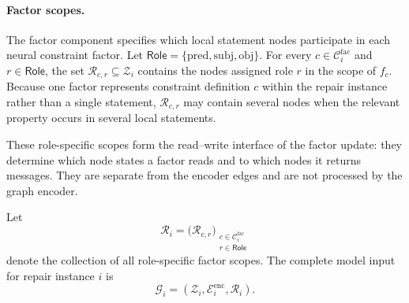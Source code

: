 \documentclass[a4paper,UKenglish,cleveref,autoref,thm-restate]{tgdk-v2021}
\begin{document}
\paragraph*{Factor scopes.}
The factor component specifies which local statement nodes participate in each neural constraint factor. Let \(\mathsf{Role}=\{\mathrm{pred},\mathrm{subj},\mathrm{obj}\}\). For every \(c\in\mathcal{C}_i^{\mathrm{fac}}\) and \(r\in\mathsf{Role}\), the set \(\mathcal{R}_{c,r}\subseteq\mathcal{Z}_i\) contains the nodes assigned role \(r\) in the scope of \(f_c\). Because one factor represents constraint definition \(c\) within the repair instance rather than a single statement, \(\mathcal{R}_{c,r}\) may contain several nodes when the relevant property occurs in several local statements.

These role-specific scopes form the read--write interface of the factor update: they determine which node states a factor reads and to which nodes it returns messages. They are separate from the encoder edges and are not processed by the graph encoder.

Let
\[
\mathcal{R}_i=\bigl(\mathcal{R}_{c,r}\bigr)_{\substack{c\in\mathcal{C}_i^{\mathrm{fac}}\\r\in\mathsf{Role}}}
\]
denote the collection of all role-specific factor scopes. The complete model input for repair instance \(i\) is
\[
\mathcal{G}_i=(\mathcal{Z}_i,\mathcal{E}_i^{\mathrm{enc}},\mathcal{R}_i).
\]
\end{document}
